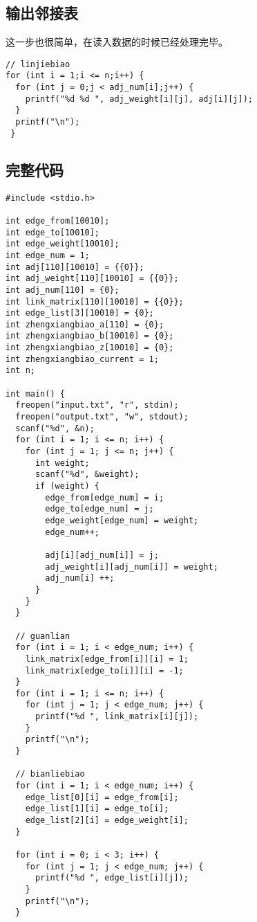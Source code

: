 \documentclass[11pt]{article}
\begin{document}
\subsection{输出邻接表}
\label{sec:org283bf51}
这一步也很简单，在读入数据的时候已经处理完毕。

\begin{verbatim}
// linjiebiao
for (int i = 1;i <= n;i++) {
  for (int j = 0;j < adj_num[i];j++) {
    printf("%d %d ", adj_weight[i][j], adj[i][j]);
  }
  printf("\n");
 }
\end{verbatim}

\subsection{完整代码}
\label{sec:orgdab85eb}
\begin{verbatim}
#include <stdio.h>

int edge_from[10010];
int edge_to[10010];
int edge_weight[10010];
int edge_num = 1;
int adj[110][10010] = {{0}};
int adj_weight[110][10010] = {{0}};
int adj_num[110] = {0};
int link_matrix[110][10010] = {{0}};
int edge_list[3][10010] = {0};
int zhengxiangbiao_a[110] = {0};
int zhengxiangbiao_b[10010] = {0};
int zhengxiangbiao_z[10010] = {0};
int zhengxiangbiao_current = 1;
int n;

int main() {
  freopen("input.txt", "r", stdin);
  freopen("output.txt", "w", stdout);
  scanf("%d", &n);
  for (int i = 1; i <= n; i++) {
    for (int j = 1; j <= n; j++) {
      int weight;
      scanf("%d", &weight);
      if (weight) {
        edge_from[edge_num] = i;
        edge_to[edge_num] = j;
        edge_weight[edge_num] = weight;
        edge_num++;

        adj[i][adj_num[i]] = j;
        adj_weight[i][adj_num[i]] = weight;
        adj_num[i] ++;
      }
    }
  }

  // guanlian
  for (int i = 1; i < edge_num; i++) {
    link_matrix[edge_from[i]][i] = 1;
    link_matrix[edge_to[i]][i] = -1;
  }
  for (int i = 1; i <= n; i++) {
    for (int j = 1; j < edge_num; j++) {
      printf("%d ", link_matrix[i][j]);
    }
    printf("\n");
  }

  // bianliebiao
  for (int i = 1; i < edge_num; i++) {
    edge_list[0][i] = edge_from[i];
    edge_list[1][i] = edge_to[i];
    edge_list[2][i] = edge_weight[i];
  }

  for (int i = 0; i < 3; i++) {
    for (int j = 1; j < edge_num; j++) {
      printf("%d ", edge_list[i][j]);
    }
    printf("\n");
  }


\end{verbatim}
\end{document}
